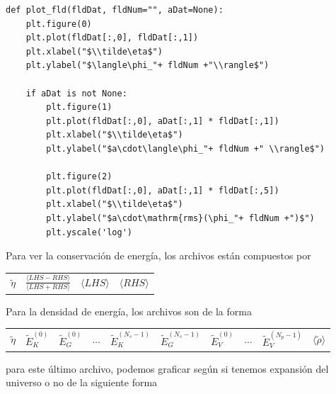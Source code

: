 \begin{lstlisting}[style = pythonStyle]
def plot_fld(fldDat, fldNum="", aDat=None):
    plt.figure(0)
    plt.plot(fldDat[:,0], fldDat[:,1])
    plt.xlabel("$\\tilde\eta$")
    plt.ylabel("$\langle\phi_"+ fldNum +"\\rangle$")
    
    if aDat is not None:
        plt.figure(1)
        plt.plot(fldDat[:,0], aDat[:,1] * fldDat[:,1])
        plt.xlabel("$\\tilde\eta$")
        plt.ylabel("$a\cdot\langle\phi_"+ fldNum +" \\rangle$")
    
        plt.figure(2)
        plt.plot(fldDat[:,0], aDat[:,1] * fldDat[:,5])
        plt.xlabel("$\\tilde\eta$")
        plt.ylabel("$a\cdot\mathrm{rms}(\phi_"+ fldNum +")$")
        plt.yscale('log')
\end{lstlisting}

Para ver la conservación de energía, los archivos están compuestos por

\begin{center}
    \begin{tabular}{|c|c|c|c|}
        $\tilde\eta$ & $\frac{\langle LHS - RHS\rangle}{\langle LHS + RHS\rangle}$ & $\langle LHS \rangle$ & $\langle RHS \rangle$
    \end{tabular}
\end{center}

Para la densidad de energía, los archivos son de la forma

\begin{center}
    \begin{tabular}{|c|c|c|c|c|c|c|c|c|c|}
        $\tilde\eta$ & $\tilde E_K^{(0)}$ & $\tilde E_G^{(0)}$ & $\dots$ & $\tilde E_K^{(N_s-1)}$ & $\tilde E_G^{(N_s-1)}$ &  $\tilde E_V^{(0)}$ & $\dots$ &  $\tilde E_V^{(N_p-1)}$ & $\langle \tilde \rho \rangle$
    \end{tabular}
\end{center}

\noindent
para este último archivo, podemos graficar según si tenemos expansión del universo o no de la siguiente forma

